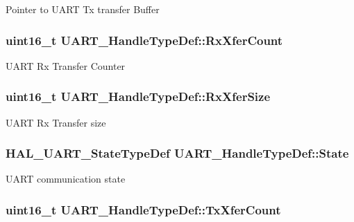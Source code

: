 Pointer to U\-A\-R\-T Tx transfer Buffer \hypertarget{struct_u_a_r_t___handle_type_def_ade988f08540556bd89766e4cc2bb4dec}{
\subsubsection[{Rx\-Xfer\-Count}]{\setlength{\rightskip}{0pt plus 5cm}uint16\-\_\-t U\-A\-R\-T\-\_\-\-Handle\-Type\-Def\-::\-Rx\-Xfer\-Count}}\label{struct_u_a_r_t___handle_type_def_ade988f08540556bd89766e4cc2bb4dec}
U\-A\-R\-T Rx Transfer Counter \hypertarget{struct_u_a_r_t___handle_type_def_a22782fdbe156661bc9710efd02228746}{
\subsubsection[{Rx\-Xfer\-Size}]{\setlength{\rightskip}{0pt plus 5cm}uint16\-\_\-t U\-A\-R\-T\-\_\-\-Handle\-Type\-Def\-::\-Rx\-Xfer\-Size}}\label{struct_u_a_r_t___handle_type_def_a22782fdbe156661bc9710efd02228746}
U\-A\-R\-T Rx Transfer size \hypertarget{struct_u_a_r_t___handle_type_def_a61f2d1d0228c38b6e1e32eed80dbf0c8}{
\subsubsection[{State}]{ {\bf H\-A\-L\-\_\-\-U\-A\-R\-T\-\_\-\-State\-Type\-Def} U\-A\-R\-T\-\_\-\-Handle\-Type\-Def\-::\-State}}\label{struct_u_a_r_t___handle_type_def_a61f2d1d0228c38b6e1e32eed80dbf0c8}
U\-A\-R\-T communication state \hypertarget{struct_u_a_r_t___handle_type_def_a874ef209c0571231b2e4b951007eefac}{
\subsubsection[{Tx\-Xfer\-Count}]{\setlength{\rightskip}{0pt plus 5cm}uint16\-\_\-t U\-A\-R\-T\-\_\-\-Handle\-Type\-Def\-::\-Tx\-Xfer\-Count}}\label{struct_u_a_r_t___handle_type_def_a874ef209c0571231b2e4b951007eefac}

